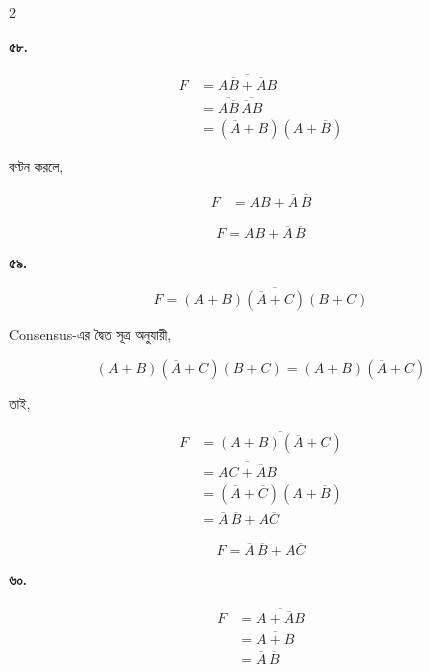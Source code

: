 \begin{multicols}{2}
\medskip


\textbf{৫৮.}

\[
\begin{aligned}
F
&=\overline{A\overline B+\overline AB}\\
&=\overline{A\overline B}\,
\overline{\overline AB}\\
&=(\overline A+B)(A+\overline B)
\end{aligned}
\]

বণ্টন করলে,

\[
\begin{aligned}
F
&=AB+\overline A\,\overline B
\end{aligned}
\]

\[
\boxed{F=AB+\overline A\,\overline B}
\]

\medskip


\textbf{৫৯.}

\[
F=
\overline{(A+B)(\overline A+C)(B+C)}
\]

\textenglish{Consensus}-এর দ্বৈত সূত্র অনুযায়ী,

\[
(A+B)(\overline A+C)(B+C)
=
(A+B)(\overline A+C)
\]

তাই,

\[
\begin{aligned}
F
&=\overline{(A+B)(\overline A+C)}\\
&=\overline{AC+\overline AB}\\
&=(\overline A+\overline C)(A+\overline B)\\
&=\overline A\,\overline B+A\overline C
\end{aligned}
\]

\[
\boxed{F=\overline A\,\overline B+A\overline C}
\]

\medskip


\textbf{৬০.}

\[
\begin{aligned}
F
&=\overline{A+\overline AB}\\
&=\overline{A+B}\\
&=\overline A\,\overline B
\end{aligned}
\]


\end{multicols}
